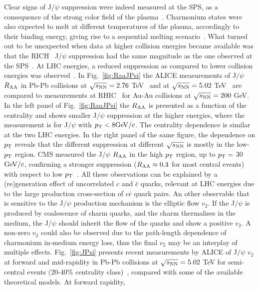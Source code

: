 Clear signs of J$/\psi$ suppression were indeed measured at the SPS, as a 
consequence of the strong color field of the plasma~\cite{Abreu:2000ni}. 
Charmonium states were also expected to melt at different temperatures of 
the plasma, accordingly to their binding energy, giving rise to a sequential melting 
scenario~\cite{Du:2015wha,Digal:2001ue}. What turned 
out to be unexpected when data at higher collision energies became available 
was that the RICH~\cite{Adare:2011yf,Adare:2006ns} J$/\psi$ suppression 
had the same magnitude as the one observed at the SPS~\cite{Scomparin:2007rt}.
At LHC energies, a reduced suppression as compared to lower
collision energies was observed~\cite{Abelev:2013ila}.
In Fig.~\ref{fig:RaaJPsi} the ALICE measurements 
of J$/\psi$ $R_{\rm AA}$ in Pb-Pb collisions at $\sqrt{s_{\rm NN}} = 2.76$ TeV~\cite{Abelev:2013ila} 
and at $\sqrt{s_{\rm NN}} = 5.02$ TeV~\cite{Adam:2016rdg} are compared to measurements at 
RHIC~\cite{Adare:2011yf} for Au-Au collisions at $\sqrt{s_{\rm NN}} = 200$ GeV. In the left panel of Fig.~\ref{fig:RaaJPsi} 
the $R_{\rm AA}$ is presented as a function of the centrality and shows smaller J$/\psi$ suppression 
at the higher energies, where the measurement is for J$/\psi$ with $p_{\rm T} < 8 \mathrm{GeV}/c$. 
The centrality dependence is similar at the two LHC energies. 
In the right panel of the same figure, the 
dependence on $p_{\rm T}$ reveals that the different suppression at different $\sqrt{s_{\rm NN}}$ is mostly
in the low-$p_{\rm T}$ region.
CMS measured the J$/\psi$ $R_{\rm AA}$ 
in the high $p_{\rm T}$ region, up to $p_{\rm T} = $ 30 $\mathrm{GeV}/c$, confirming a stronger suppression
($R_{\rm AA} \approx 0.3$ for most central events) with respect to 
low $p_{\rm T}$~\cite{Khachatryan:2016ypw}. All these observations can be 
explained by a (re)generation effect of uncorrelated $c$ and $\bar{c}$ quarks, relevant at LHC energies due to the 
large production cross-section of $c\bar{c}$ quark pairs. 
An other observable that is sensitive to the J$/\psi$ production 
mechanism is the elliptic flow $v_2$. If the J$/\psi$ is produced by coalescence 
of charm quarks, and the charm thermalises in the medium, the J$/\psi$ 
should inherit the flow of the quarks and show a positive $v_2$. 
A non-zero $v_2$ could also be observed due to the path-length dependence of charmonium
in-medium energy loss, thus the final $v_2$ may be an 
interplay of multiple effects. Fig.~\ref{fig:JPsi} presents recent measurements 
by ALICE of J$/\psi$ $v_2$ at forward and mid-rapidity in Pb-Pb collisions at 
$\sqrt{s_{\rm NN}} = 5.02$ TeV for semi-central events (20-40\% centrality class)~\cite{Acharya:2017tgv}, 
compared with some of the available theoretical models. At forward rapidity, 
